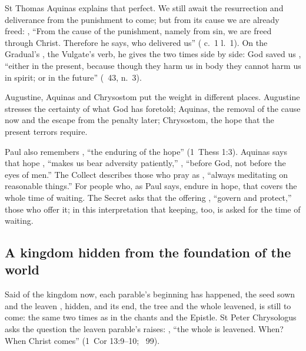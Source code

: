 St Thomas Aquinas explains that perfect. We still await the resurrection and
deliverance from the punishment to come; but from its cause we are already
freed: , ``From the cause of the punishment,
namely from sin, we are freed through Christ. Therefore he says, who
delivered us'' ( c.~1 l.~1). On the Gradual's
, the Vulgate's verb, he gives the two times side by side:
God saved us , ``either in the
present, because though they harm us in body they cannot harm us in spirit;
or in the future'' (~43, n.~3).

Augustine, Aquinas and Chrysostom put the weight in different places.
Augustine stresses the certainty of what God has foretold; Aquinas, the
removal of the cause now and the escape from the penalty later; Chrysostom,
the hope that the present terrors require.

Paul also remembers , ``the enduring of the hope''
(1~Thess 1:3). Aquinas says that hope , ``makes us bear adversity patiently,'' , ``before God, not before the eyes of men.'' The Collect
describes those who pray as , ``always
meditating on reasonable things.'' For people who, as Paul says, endure in
hope, that  covers the whole time of waiting. The Secret asks
that the offering , ``govern and protect,'' those
who offer it; in this interpretation that keeping, too, is asked for the time
of waiting.

\subsection{A kingdom hidden from the foundation of the world}
\label{sec:awaited-gospel}

Said of the kingdom now, each parable's beginning has happened, the seed sown
and the leaven , hidden, and its end, the tree and the whole
leavened, is still to come: the same two times as in the chants and the
Epistle. St Peter Chrysologus asks the question the leaven parable's
 raises: , ``the whole is leavened. When? When Christ comes'' (1~Cor 13:9--10;
~99).

